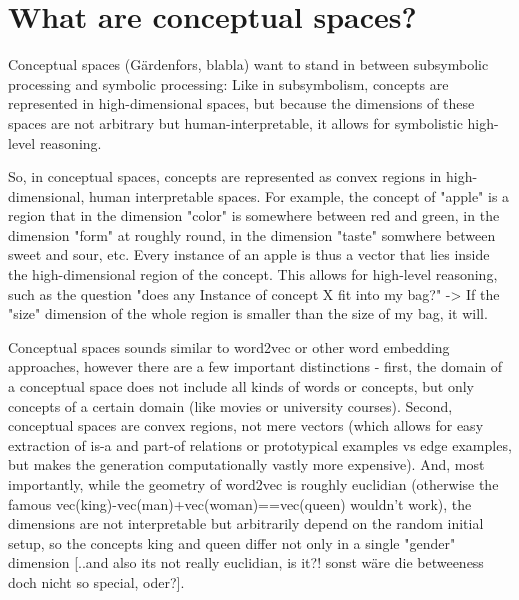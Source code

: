 \documentclass[11pt,
  paper=a4, 
  hidelinks,
  bibliography=totocnumbered,
	captions=tableheading,
	BCOR=10mm
]{scrreprt}
\theoremstyle{definition}
\begin{document}
\section{What are conceptual spaces? }

Conceptual spaces (Gärdenfors, blabla) want to stand in between subsymbolic processing and symbolic processing: Like in subsymbolism, concepts are represented in high-dimensional spaces, but because the dimensions of these spaces are not arbitrary but human-interpretable, it allows for symbolistic high-level reasoning.

So, in conceptual spaces, concepts are represented as convex regions in high-dimensional, human interpretable spaces. For example, the concept of "apple" is a region that in the dimension "color" is somewhere between red and green, in the dimension "form" at roughly round, in the dimension "taste" somwhere between sweet and sour, etc. 
Every instance of an apple is thus a vector that lies inside the high-dimensional region of the concept. This allows for high-level reasoning, such as the question "does any Instance of concept X fit into my bag?" -> If the "size" dimension of the whole region is smaller than the size of my bag, it will.

Conceptual spaces sounds similar to word2vec or other word embedding approaches, however there are a few important distinctions - first, the domain of a conceptual space does not include all kinds of words or concepts, but only concepts of a certain domain (like movies or university courses). 
Second, conceptual spaces are convex regions, not mere vectors (which allows for easy extraction of is-a and part-of relations or prototypical examples vs edge examples, but makes the generation computationally vastly more expensive). And, most importantly, while the geometry of word2vec is roughly euclidian (otherwise the famous vec(king)-vec(man)+vec(woman)==vec(queen) wouldn't work), the dimensions are not interpretable but arbitrarily depend on the random initial setup, so the concepts king and queen differ not only in a single "gender" dimension [..and also its not really euclidian, is it?! sonst wäre die betweeness doch nicht so special, oder?].
\end{document}

